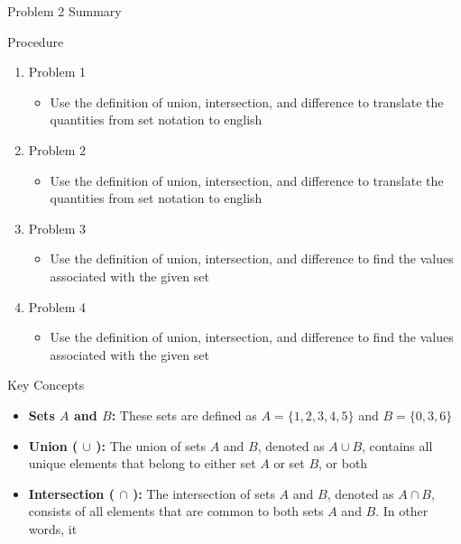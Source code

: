 \begin{summary}{Problem 2 Summary}
    \begin{statement}{Procedure}
        \begin{enumerate}
            \item Problem 1
            \begin{itemize}
                \item Use the definition of union, intersection, and difference to translate the quantities from set notation to english
            \end{itemize}
            \item Problem 2
            \begin{itemize}
                \item Use the definition of union, intersection, and difference to translate the quantities from set notation to english
            \end{itemize}
            \item Problem 3
            \begin{itemize}
                \item Use the definition of union, intersection, and difference to find the values associated with the given set
            \end{itemize}
            \item Problem 4
            \begin{itemize}
                \item Use the definition of union, intersection, and difference to find the values associated with the given set
            \end{itemize}
        \end{enumerate}
    \end{statement}
    \begin{statement}{Key Concepts}
        \begin{itemize}
            \item \textbf{Sets $A$ and $B$:} These sets are defined as $A = \{1, 2, 3, 4, 5\}$ and $B = \{0, 3, 6\}$
            \item \textbf{Union ( $\cup$ ):} The union of sets $A$ and $B$, denoted as $A \cup B$, contains all unique elements that belong to either set $A$ or set $B$, or both
            \item \textbf{Intersection ( $\cap$ ):} The intersection of sets $A$ and $B$, denoted as $A \cap B$, consists of all elements that are common to both sets $A$ and $B$. In other words, it 

\end{itemize}
\end{statement}
\end{summary}
